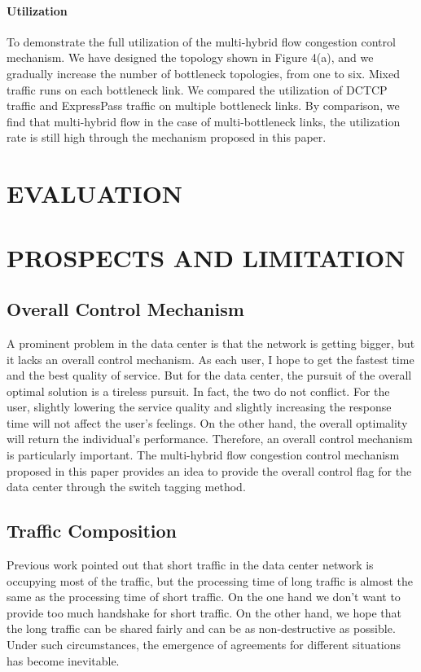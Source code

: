 \documentclass[conference]{IEEEtran}
\begin{document}
\paragraph{Utilization} To demonstrate the full utilization of the multi-hybrid flow congestion control mechanism. We have designed the topology shown in Figure 4(a), and we gradually increase the number of bottleneck topologies, from one to six. Mixed traffic runs on each bottleneck link. We compared the utilization of DCTCP traffic and ExpressPass traffic on multiple bottleneck links. By comparison, we find that multi-hybrid flow in the case of multi-bottleneck links, the utilization rate is still high through the mechanism proposed in this paper.
\section{EVALUATION}
\section{PROSPECTS AND LIMITATION}
\subsection{Overall Control Mechanism} A prominent problem in the data center is that the network is getting bigger, but it lacks an overall control mechanism. As each user, I hope to get the fastest time and the best quality of service. But for the data center, the pursuit of the overall optimal solution is a tireless pursuit. In fact, the two do not conflict. For the user, slightly lowering the service quality and slightly increasing the response time will not affect the user's feelings. On the other hand, the overall optimality will return the individual's performance. Therefore, an overall control mechanism is particularly important. The multi-hybrid flow congestion control mechanism proposed in this paper provides an idea to provide the overall control flag for the data center through the switch tagging method.
\subsection{Traffic Composition} Previous work pointed out that short traffic in the data center network is occupying most of the traffic, but the processing time of long traffic is almost the same as the processing time of short traffic. On the one hand we don't want to provide too much handshake for short traffic. On the other hand, we hope that the long traffic can be shared fairly and can be as non-destructive as possible. Under such circumstances, the emergence of agreements for different situations has become inevitable.
\end{document}
